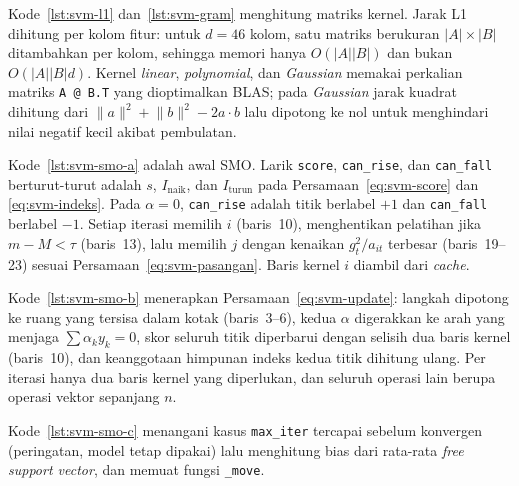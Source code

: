 
Kode~\ref{lst:svm-l1} dan~\ref{lst:svm-gram} menghitung matriks kernel. Jarak L1 dihitung per kolom fitur: untuk $d = 46$ kolom, satu matriks berukuran $|A| \times |B|$ ditambahkan per kolom, sehingga memori hanya $O(|A||B|)$ dan bukan $O(|A||B|d)$. Kernel \textit{linear}, \textit{polynomial}, dan \textit{Gaussian} memakai perkalian matriks \texttt{A @ B.T} yang dioptimalkan BLAS; pada \textit{Gaussian} jarak kuadrat dihitung dari $\lVert a\rVert^2 + \lVert b\rVert^2 - 2a\cdot b$ lalu dipotong ke nol untuk menghindari nilai negatif kecil akibat pembulatan.



Kode~\ref{lst:svm-smo-a} adalah awal SMO. Larik \texttt{score}, \texttt{can\_rise}, dan \texttt{can\_fall} berturut-turut adalah $s$, $I_{\text{naik}}$, dan $I_{\text{turun}}$ pada Persamaan~\eqref{eq:svm-score} dan \eqref{eq:svm-indeks}. Pada $\alpha = 0$, \texttt{can\_rise} adalah titik berlabel $+1$ dan \texttt{can\_fall} berlabel $-1$. Setiap iterasi memilih $i$ (baris~10), menghentikan pelatihan jika $m - M < \tau$ (baris~13), lalu memilih $j$ dengan kenaikan $g_t^2/a_{it}$ terbesar (baris~19--23) sesuai Persamaan~\eqref{eq:svm-pasangan}. Baris kernel $i$ diambil dari \textit{cache}.


Kode~\ref{lst:svm-smo-b} menerapkan Persamaan~\eqref{eq:svm-update}: langkah dipotong ke ruang yang tersisa dalam kotak (baris~3--6), kedua $\alpha$ digerakkan ke arah yang menjaga $\sum\alpha_k y_k = 0$, skor seluruh titik diperbarui dengan selisih dua baris kernel (baris~10), dan keanggotaan himpunan indeks kedua titik dihitung ulang. Per iterasi hanya dua baris kernel yang diperlukan, dan seluruh operasi lain berupa operasi vektor sepanjang $n$.


Kode~\ref{lst:svm-smo-c} menangani kasus \texttt{max\_iter} tercapai sebelum konvergen (peringatan, model tetap dipakai) lalu menghitung bias dari rata-rata \textit{free support vector}, dan memuat fungsi \texttt{\_move}.

